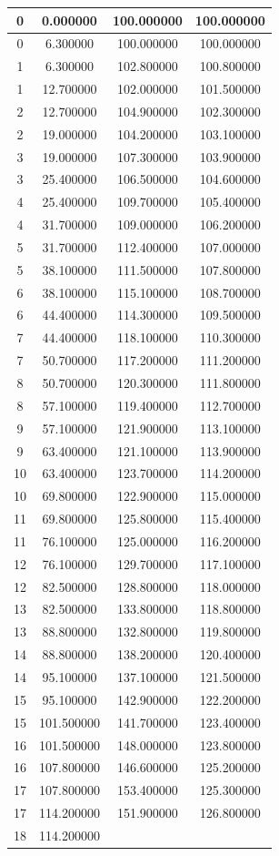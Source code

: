 \documentclass[a4paper,10pt]{article}
\begin{document}
\begin{enumerate}
\begin{center}
\begin{tabular}{|c|c|c|c|}
0 & 0.000000 & 100.000000 & 100.000000 \\ \hline 0 & 6.300000 & 100.000000 & 100.000000 \\ \hline 1 & 6.300000 & 102.800000 & 100.800000 \\ \hline 1 & 12.700000 & 102.000000 & 101.500000 \\ \hline 2 & 12.700000 & 104.900000 & 102.300000 \\ \hline 2 & 19.000000 & 104.200000 & 103.100000 \\ \hline 3 & 19.000000 & 107.300000 & 103.900000 \\ \hline 3 & 25.400000 & 106.500000 & 104.600000 \\ \hline 4 & 25.400000 & 109.700000 & 105.400000 \\ \hline 4 & 31.700000 & 109.000000 & 106.200000 \\ \hline 5 & 31.700000 & 112.400000 & 107.000000 \\ \hline 5 & 38.100000 & 111.500000 & 107.800000 \\ \hline 6 & 38.100000 & 115.100000 & 108.700000 \\ \hline 6 & 44.400000 & 114.300000 & 109.500000 \\ \hline 7 & 44.400000 & 118.100000 & 110.300000 \\ \hline 7 & 50.700000 & 117.200000 & 111.200000 \\ \hline 8 & 50.700000 & 120.300000 & 111.800000 \\ \hline 8 & 57.100000 & 119.400000 & 112.700000 \\ \hline 9 & 57.100000 & 121.900000 & 113.100000 \\ \hline 9 & 63.400000 & 121.100000 & 113.900000 \\ \hline 10 & 63.400000 & 123.700000 & 114.200000 \\ \hline 10 & 69.800000 & 122.900000 & 115.000000 \\ \hline 11 & 69.800000 & 125.800000 & 115.400000 \\ \hline 11 & 76.100000 & 125.000000 & 116.200000 \\ \hline 12 & 76.100000 & 129.700000 & 117.100000 \\ \hline 12 & 82.500000 & 128.800000 & 118.000000 \\ \hline 13 & 82.500000 & 133.800000 & 118.800000 \\ \hline 13 & 88.800000 & 132.800000 & 119.800000 \\ \hline 14 & 88.800000 & 138.200000 & 120.400000 \\ \hline 14 & 95.100000 & 137.100000 & 121.500000 \\ \hline 15 & 95.100000 & 142.900000 & 122.200000 \\ \hline 15 & 101.500000 & 141.700000 & 123.400000 \\ \hline 16 & 101.500000 & 148.000000 & 123.800000 \\ \hline 16 & 107.800000 & 146.600000 & 125.200000 \\ \hline 17 & 107.800000 & 153.400000 & 125.300000 \\ \hline 17 & 114.200000 & 151.900000 & 126.800000 \\ \hline 18 & 114.200000 & 
\end{tabular}
\end{center}
\end{enumerate}
\end{document}
